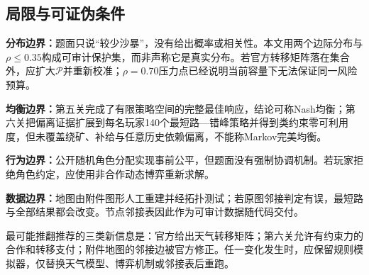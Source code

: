 \subsection{局限与可证伪条件}

\begin{boundarybox}
\textbf{分布边界：}题面只说“较少沙暴”，没有给出概率或相关性。本文用两个边际分布与$\rho\le0.35$构成可审计保护集，而非声称它是真实分布。若官方转移矩阵落在集合外，应扩大$\mathcal P$并重新校准；$\rho=0.70$压力点已经说明当前容量下无法保证同一风险预算。

\textbf{均衡边界：}第五关完成了有限策略空间的完整最佳响应，结论可称Nash均衡；第六关把偏离证据扩展到每名玩家140个最短路—错峰策略并得到类约束零可利用度，但未覆盖绕矿、补给与任意历史依赖偏离，不能称Markov完美均衡。

\textbf{行为边界：}公开随机角色分配实现事前公平，但题面没有强制协调机制。若玩家拒绝角色约定，应使用非合作动态博弈重新求解。

\textbf{数据边界：}地图由附件图形人工重建并经拓扑测试；若原图邻接判定有误，最短路与全部结果都会改变。节点邻接表因此作为可审计数据随代码交付。
\end{boundarybox}

最可能推翻推荐的三类新信息是：官方给出天气转移矩阵；第六关允许有约束力的合作和转移支付；附件地图的邻接边被官方修正。任一变化发生时，应保留规则模拟器，仅替换天气模型、博弈机制或邻接表后重跑。
